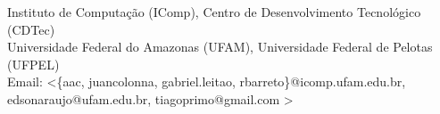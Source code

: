 %
%
%



\usepackage{times}
{
  \usepackage{times}
  \usepackage{mathptmx}
  \usepackage[left=1.5cm,right=6cm,top=1.5cm,bottom=3cm]{geometry}
}

\usepackage{hyperref}
\usepackage[T1]{fontenc}
\usepackage{tikz}
\usepackage{colortbl}
\usepackage{yfonts}
\usepackage{colortbl}



\def\lecturename{XXVIII Simp\'{o}sio Brasileiro de Inform\'{a}tica na Educa\c{c}\~{a}o}

\title{\insertlecture}

\author{Anderson Cruz, Juan Colonna, Gabriel Leit\~{a}o, \\ Edson Silva, Raimundo Barreto, Tiago Primo} 

\institute
{

\begin{tiny}
 Instituto de Computa\c{c}\~ao (IComp), Centro de Desenvolvimento Tecnol\'{o}gico (CDTec)\\
 Universidade Federal do Amazonas (UFAM), Universidade Federal de Pelotas (UFPEL) \\
 Email: <\{aac, juancolonna, gabriel.leitao, rbarreto\}@icomp.ufam.edu.br, \\ edsonaraujo@ufam.edu.br, tiagoprimo@gmail.com > \\
\end{tiny}
}

\subject{\lecturename}







